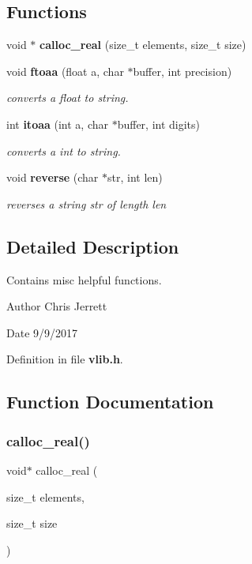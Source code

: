 \subsection*{Functions}
\begin{DoxyCompactItemize}
\item 
void $\ast$ \textbf{ calloc\+\_\+real} (size\+\_\+t elements, size\+\_\+t size)
\item 
void \textbf{ ftoaa} (float a, char $\ast$buffer, int precision)
\begin{DoxyCompactList}\small\item\em converts a float to string. \end{DoxyCompactList}\item 
int \textbf{ itoaa} (int a, char $\ast$buffer, int digits)
\begin{DoxyCompactList}\small\item\em converts a int to string. \end{DoxyCompactList}\item 
void \textbf{ reverse} (char $\ast$str, int len)
\begin{DoxyCompactList}\small\item\em reverses a string \textquotesingle{}str\textquotesingle{} of length \textquotesingle{}len\textquotesingle{} \end{DoxyCompactList}\end{DoxyCompactItemize}


\subsection{Detailed Description}
Contains misc helpful functions. 

\begin{DoxyAuthor}{Author}
Chris Jerrett 
\end{DoxyAuthor}
\begin{DoxyDate}{Date}
9/9/2017 
\end{DoxyDate}


Definition in file \textbf{ vlib.\+h}.



\subsection{Function Documentation}
\mbox{\label{vlib_8h_a1115803c6996aebfbf67434810df7b4b}} 
\subsubsection{calloc\+\_\+real()}
{\footnotesize\ttfamily void$\ast$ calloc\+\_\+real (\begin{DoxyParamCaption}\item[{size\+\_\+t}]{elements,  }\item[{size\+\_\+t}]{size }\end{DoxyParamCaption})}

